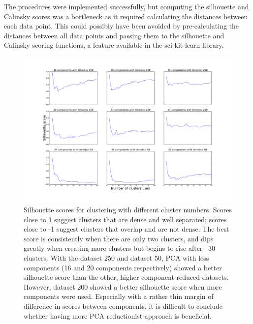 The procedures were implemented successfully, but computing the silhouette and Calinsky scores was a bottleneck as it required calculating the distances between each data point. This could possibly have been avoided by pre-calculating the distances between all data points and passing them to the silhouette and Calinsky scoring functions, a feature available in the sci-kit learn library.

\begin{figure}[H]
  \centering
  \includegraphics[width=\linewidth]{figures/silhouette_scores.pdf}
  \caption{Silhouette scores for clustering with different cluster numbers. Scores close to 1 suggest clusters that are dense and well separated; scores close to -1 suggest clusters that overlap and are not dense. The best score is consistently when there are only two clusters, and dips greatly when creating more clusters but begins to rise after ~30 clusters. With the dataset 250 and dataset 50, PCA with less components (16 and 20 components respectively) showed a better silhouette score than the other, higher component reduced datasets. However, dataset 200 showed a better silhouette score when more components were used. Especially with a rather thin margin of difference in scores between components, it is difficult to conclude whether having more PCA reductionist approach is beneficial.}
  \label{fig:silhouette_scores}
\end{figure}



